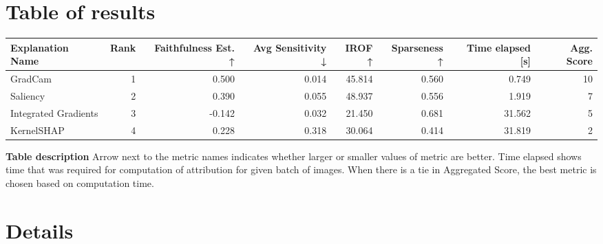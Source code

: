 \documentclass{article}%
\begin{document}
\section*{Table of results}%
\label{sec:Tableofresults}%
\begin{footnotesize}%
\begin{flushleft} %
\begin{tabular}{lrrrrrrr}
\toprule
    Explanation Name &  Rank &  Faithfulness Est. ↑ &  Avg Sensitivity ↓ &  IROF ↑ &  Sparseness ↑ &  Time elapsed [s] &  Agg. Score \\
\midrule
             GradCam &     1 &                0.500 &              0.014 &  45.814 &         0.560 &             0.749 &          10 \\
            Saliency &     2 &                0.390 &              0.055 &  48.937 &         0.556 &             1.919 &           7 \\
Integrated Gradients &     3 &               -0.142 &              0.032 &  21.450 &         0.681 &            31.562 &           5 \\
          KernelSHAP &     4 &                0.228 &              0.318 &  30.064 &         0.414 &            31.819 &           2 \\
\bottomrule
\end{tabular}
%
\end{flushleft}%
\end{footnotesize}%
\textbf{Table description \newline%
}%
Arrow next to the metric names indicates whether larger or smaller values of metric are better. Time elapsed shows time that was required for computation of attribution for given batch of images. When there is a tie in Aggregated Score, the best metric is chosen based on computation time.

%
\newpage%
\section*{Details}%
\label{sec:Details}%
\end{document}
